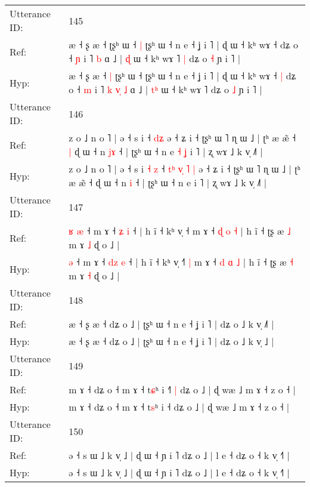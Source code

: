 \documentclass[10pt]{article}
\DeclareRobustCommand{\hl}[1]{{\textcolor{red}{#1}}}
\begin{document}
\begin{longtable}{ll}
 \\
\midrule
Utterance ID: & 145 \\
Ref: & æ ˧ ʂ æ ˧\hl{}\hl{} ʈʂʰ ɯ ˧\hl{ }\hl{|} ʈʂʰ ɯ ˧ n e ˧ ʝ i ˥ | ɖ ɯ ˧ kʰ wɤ ˧\hl{}\hl{} dʑ o ˧ \hl{ɲ} i ˥\hl{}\hl{}\hl{}\hl{}\hl{} \hl{b} ɑ ˩ | \hl{}\hl{ɖ} ɯ ˧ kʰ wɤ ˥\hl{ }\hl{|} dʑ o \hl{˧} ɲ i ˥ |
 \\
Hyp: & æ ˧ ʂ æ ˧\hl{ }\hl{|} ʈʂʰ ɯ ˧\hl{}\hl{} ʈʂʰ ɯ ˧ n e ˧ ʝ i ˥ | ɖ ɯ ˧ kʰ wɤ ˧\hl{ }\hl{|} dʑ o ˧ \hl{m} i ˥\hl{ }\hl{k}\hl{ }\hl{v}\hl{̩} \hl{˩} ɑ ˩ | \hl{t}\hl{ʰ} ɯ ˧ kʰ wɤ ˥\hl{}\hl{} dʑ o \hl{˩} ɲ i ˥ |
 \\
\midrule
Utterance ID: & 146 \\
Ref: & z o ˩ n o ˥ | ə ˧ s i\hl{}\hl{}\hl{}\hl{} ˧\hl{}\hl{}\hl{}\hl{}\hl{}\hl{} \hl{}\hl{d}\hl{ʑ} ə ˧ ʑ i ˧ ʈʂʰ ɯ ˥ ɳ ɯ ˩ | ʈʰ æ æ̃ ˧\hl{ }\hl{|} ɖ ɯ ˧ n \hl{j}\hl{ɤ} ˧ | ʈʂʰ ɯ ˧ n e\hl{ }\hl{˧}\hl{ }\hl{ʝ} i ˥ | ʐ wɤ ˩ k v̩ ˩˥ |
 \\
Hyp: & z o ˩ n o ˥ | ə ˧ s i\hl{ }\hl{˧}\hl{ }\hl{z} ˧\hl{ }\hl{t}\hl{ʰ}\hl{ }\hl{v}\hl{̩} \hl{˥}\hl{ }\hl{|} ə ˧ ʑ i ˧ ʈʂʰ ɯ ˥ ɳ ɯ ˩ | ʈʰ æ æ̃ ˧\hl{}\hl{} ɖ ɯ ˧ n \hl{}\hl{i} ˧ | ʈʂʰ ɯ ˧ n e\hl{}\hl{}\hl{}\hl{} i ˥ | ʐ wɤ ˩ k v̩ ˩˥ |
 \\
\midrule
Utterance ID: & 147 \\
Ref: & \hl{ʁ}\hl{ }\hl{æ} ˧ m ɤ ˧ \hl{}\hl{ʑ} \hl{i} ˧ | h ĩ ˧ kʰ v̩ ˧\hl{}\hl{}\hl{} m ɤ ˧ \hl{ɖ} \hl{o} \hl{˧} | h ĩ ˧ ʈʂ æ \hl{˩} m ɤ \hl{˩} ɖ o ˩ |
 \\
Hyp: & \hl{}\hl{}\hl{ə} ˧ m ɤ ˧ \hl{d}\hl{z} \hl{e} ˧ | h ĩ ˧ kʰ v̩ ˧\hl{˥}\hl{ }\hl{|} m ɤ ˧ \hl{d} \hl{ɑ} \hl{˩} | h ĩ ˧ ʈʂ æ \hl{˧} m ɤ \hl{˧} ɖ o ˩ |
 \\
\midrule
Utterance ID: & 148 \\
Ref: & æ ˧ ʂ æ ˧ dʑ o ˩ | ʈʂʰ ɯ ˧ n e ˧ ʝ i ˥ | dʑ o ˩ k v̩ ˩\hl{˥} |
 \\
Hyp: & æ ˧ ʂ æ ˧ dʑ o ˩ | ʈʂʰ ɯ ˧ n e ˧ ʝ i ˥ | dʑ o ˩ k v̩ ˩\hl{} |
 \\
\midrule
Utterance ID: & 149 \\
Ref: & m ɤ ˧ dʑ o ˧ m ɤ ˧ t\hl{ɕ}ʰ i ˧\hl{˥}\hl{ }\hl{|} dʑ o ˩ | ɖ wæ ˩ m ɤ ˧ z o ˧ |
 \\
Hyp: & m ɤ ˧ dʑ o ˧ m ɤ ˧ t\hl{s}ʰ i ˧\hl{}\hl{}\hl{} dʑ o ˩ | ɖ wæ ˩ m ɤ ˧ z o ˧ |
 \\
\midrule
Utterance ID: & 150 \\
Ref: & ə ˧ s ɯ ˩ k v̩ ˩ | ɖ ɯ ˧ ɲ i ˥ dʑ o ˩ | l e ˧ dʑ o ˧ k v̩ ˧˥ |
 \\
Hyp: & ə ˧ s ɯ ˩ k v̩ ˩ | ɖ ɯ ˧ ɲ i ˥ dʑ o ˩ | l e ˧ dʑ o ˧ k v̩ ˧˥ |

\end{longtable}
\end{document}
